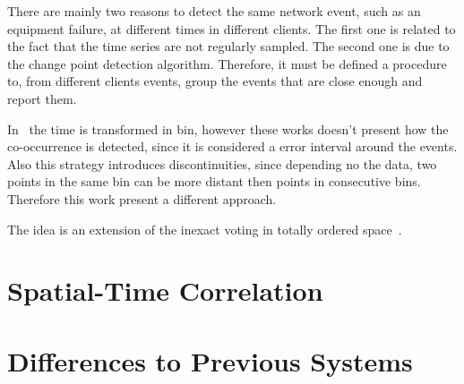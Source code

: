 There are mainly two reasons to detect the same network event, such as an
equipment failure, at different times in different clients. The first one is
related to the fact that the time series are not regularly sampled. The second
one is due to the change point detection algorithm. Therefore, it must be
defined a procedure to, from different clients events, group the events that
are close enough and report them.

In~\cite{troubleshooting_chronic_conditions_in_large_ip_networks, argus_end_to_end_service_anomaly_detection_and_localization_from_an_isps_point_of_view}
the time is transformed in bin, however these works doesn't present how the
co-occurrence is detected, since it is considered a error interval around the
events. Also this strategy introduces discontinuities, since depending no the
data, two points in the same bin can be more distant then points in consecutive
bins. Therefore this work present a different approach.

The idea is an extension of the inexact voting in totally ordered
space~\cite{voting_algorithms}.


\section{Spatial-Time Correlation}
\label{sec:spatial_time_correlation}

\section{Differences to Previous Systems}
